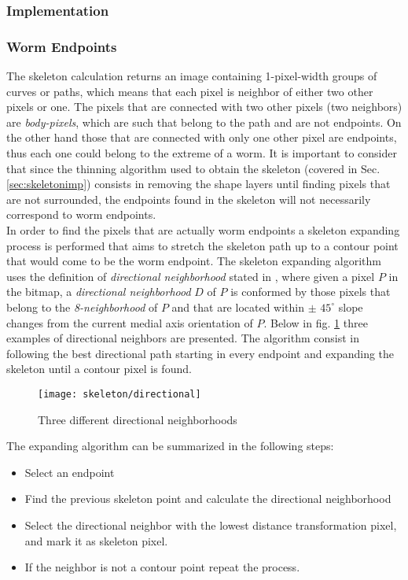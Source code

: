 \subsubsection{Implementation}
\label{segmentimp}


\subsubsection*{Worm Endpoints}
\label{sec:wend}
The skeleton calculation returns an image 
containing 1-pixel-width groups of curves or paths, which means that each pixel 
is neighbor of either two other pixels or one. The pixels that are connected with 
two other pixels (two neighbors) are \emph{body-pixels}, which are such that belong 
to the path and are not endpoints. On the other hand those that are connected with 
only one other pixel are endpoints, thus each one could belong to the extreme of a
worm. It is important to consider that since the thinning algorithm used to obtain
the skeleton (covered in Sec. \ref{sec:skeletonimp}) consists in removing the shape
layers until finding pixels that are not surrounded, the endpoints found in the
skeleton will not necessarily correspond to worm endpoints.\\

In order to find the pixels that are actually worm endpoints a skeleton expanding process
is performed that aims to stretch the skeleton path up to a contour point that 
would come to be the worm endpoint. The skeleton expanding algorithm uses the definition
of \emph{directional neighborhood} stated in \cite[p.334]{maxima}, where given 
a pixel $P$ in the bitmap, a \emph{directional neighborhood} $D$ of $P$ is 
conformed by those pixels that belong to the \emph{8-neighborhood} of $P$ and that
are located within $\pm$ $45^{\circ}$ slope changes from the current medial axis 
orientation of $P$. Below in fig. \ref{fig:directional} three examples of directional
neighbors are presented. The algorithm consist in following the best directional path
starting in every endpoint and expanding the skeleton until a contour pixel is found.
 
\begin{figure}[h t b p ! H]
 \centering
   \texttt{[image: skeleton/directional]}
 \caption{Three different directional neighborhoods}
 \label{fig:directional}
\end{figure}

The expanding algorithm can be summarized in the following steps:
\begin{itemize}
\item Select an endpoint
\item Find the previous skeleton point and calculate the directional neighborhood
\item Select the directional neighbor with the lowest distance transformation pixel,
  and mark it as skeleton pixel.
\item If the neighbor is not a contour point repeat the process.
\end{itemize}

